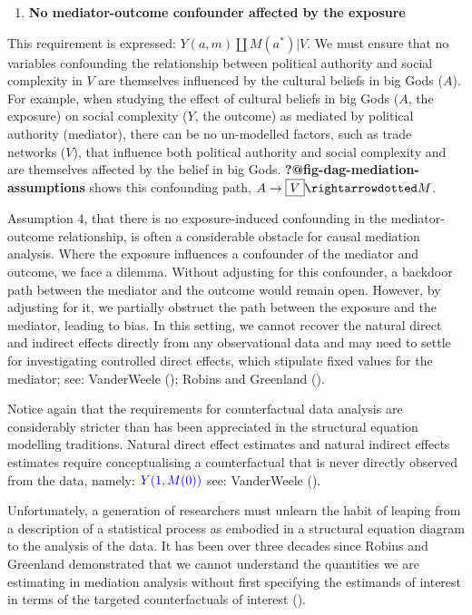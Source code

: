 \documentclass[
  single column]{article}
\providecommand{\tightlist}{%
  \setlength{\itemsep}{0pt}\setlength{\parskip}{0pt}}\usepackage{longtable,booktabs,array}
\begin{document}
\begin{enumerate}
\def\labelenumi{\arabic{enumi}.}
\setcounter{enumi}{3}
\tightlist
\item
  \textbf{No mediator-outcome confounder affected by the exposure}
\end{enumerate}

This requirement is expressed: \(Y(a,m) \coprod M(a^*) | V\). We must
ensure that no variables confounding the relationship between political
authority and social complexity in \(V\) are themselves influenced by
the cultural beliefs in big Gods (\(A\)). For example, when studying the
effect of cultural beliefs in big Gods (\(A\), the exposure) on social
complexity (\(Y\), the outcome) as mediated by political authority
(mediator), there can be no un-modelled factors, such as trade networks
(\(V\)), that influence both political authority and social complexity
and are themselves affected by the belief in big Gods.
\textbf{?@fig-dag-mediation-assumptions} shows this confounding path,
\(A\to \boxed{V}\rightarrowdotted M\).

Assumption 4, that there is no exposure-induced confounding in the
mediator-outcome relationship, is often a considerable obstacle for
causal mediation analysis. Where the exposure influences a confounder of
the mediator and outcome, we face a dilemma. Without adjusting for this
confounder, a backdoor path between the mediator and the outcome would
remain open. However, by adjusting for it, we partially obstruct the
path between the exposure and the mediator, leading to bias. In this
setting, we cannot recover the natural direct and indirect effects
directly from any observational data and may need to settle for
investigating controlled direct effects, which stipulate fixed values
for the mediator; see: VanderWeele
(); Robins and Greenland
().

Notice again that the requirements for counterfactual data analysis are
considerably stricter than has been appreciated in the structural
equation modelling traditions. Natural direct effect estimates and
natural indirect effects estimates require conceptualising a
counterfactual that is never directly observed from the data, namely:
\(\textcolor{blue}{Y(1, M(0))}\) see: VanderWeele
().

Unfortunately, a generation of researchers must unlearn the habit of
leaping from a description of a statistical process as embodied in a
structural equation diagram to the analysis of the data. It has been
over three decades since Robins and Greenland demonstrated that we
cannot understand the quantities we are estimating in mediation analysis
without first specifying the estimands of interest in terms of the
targeted counterfactuals of interest ().
\end{document}
